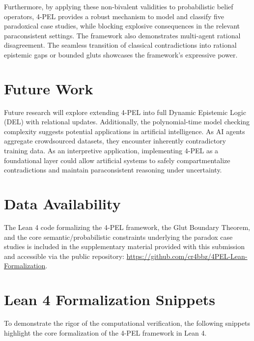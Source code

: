 \documentclass[11pt,a4paper]{article}
\begin{document}
Furthermore, by applying these non-bivalent validities to probabilistic belief operators, 4-PEL provides a robust mechanism to model and classify five paradoxical case studies, while blocking explosive consequences in the relevant paraconsistent settings. The framework also demonstrates multi-agent rational disagreement. The seamless transition of classical contradictions into rational epistemic gaps or bounded gluts showcases the framework's expressive power. 

\section{Future Work}
\label{sec:futurework}

Future research will explore extending 4-PEL into full Dynamic Epistemic Logic (DEL) \cite{baltag2008probabilistic} with relational updates. Additionally, the polynomial-time model checking complexity suggests potential applications in artificial intelligence. As AI agents aggregate crowdsourced datasets, they encounter inherently contradictory training data. As an interpretive application, implementing 4-PEL as a foundational layer could allow artificial systems to safely compartmentalize contradictions and maintain paraconsistent reasoning under uncertainty.
\section{Data Availability}
The Lean 4 code formalizing the 4-PEL framework, the Glut Boundary Theorem, and the core semantic/probabilistic constraints underlying the paradox case studies is included in the supplementary material provided with this submission and accessible via the public repository: \url{https://github.com/cr4bbz/4PEL-Lean-Formalization}.

\appendix
\section{Lean 4 Formalization Snippets}
To demonstrate the rigor of the computational verification, the following snippets highlight the core formalization of the 4-PEL framework in Lean 4.
\end{document}
